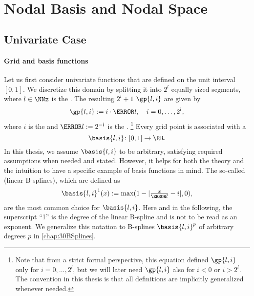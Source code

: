 \section{Nodal Basis and Nodal Space}
\label{sec:21nodalSpaces}



\subsection{Univariate Case}
\label{sec:211nodalUV}

\paragraph{Grid and basis functions}

Let us first consider univariate functions
that are defined on the unit interval $[0, 1]$.
We discretize this domain by splitting it into $2^l$ equally sized segments,
where $l \in \NNz$ is the .
The resulting $2^l + 1$  $\gp{l,i}$ are given by
\begin{equation}
  \gp{l,i} := i \cdot \ms{l},\quad
  i = 0, \dotsc, 2^l,
\end{equation}
where $i$ is the  and $\ms{l} := 2^{-l}$ is the .%
\footnote{%
  Note that from a strict formal perspective,
  this equation defined $\gp{l,i}$ only for $i = 0, \dotsc, 2^l$,
  but we will later need $\gp{l,i}$ also for $i < 0$ or $i > 2^l$.
  The convention in this thesis is that all definitions are
  implicitly generalized whenever needed.%
}
Every grid point is associated with a 
\begin{equation}
  \basis{l,i}\colon [0, 1] \to \RR.
\end{equation}
In this thesis, we assume $\basis{l,i}$ to be arbitrary,
satisfying required assumptions when needed and stated.
However, it helps for both the theory and the intuition to have a
specific example of basis functions in mind.
The so-called  (linear B-splines), which are defined as
\begin{equation}
  \label{eq:hatFunctionUV}
  \basis{l,i}^1(x)
  := \max(1 - |\tfrac{x}{\ms{l}} - i|, 0),
\end{equation}
are the most common choice for $\basis{l,i}$.
Here and in the following,
the superscript ``1'' is the degree of the linear B-spline and
is not to be read as an exponent.
We generalize this notation to B-splines $\basis{l,i}^p$ of
arbitrary degrees $p$ in \cref{chap:30BSplines}.

